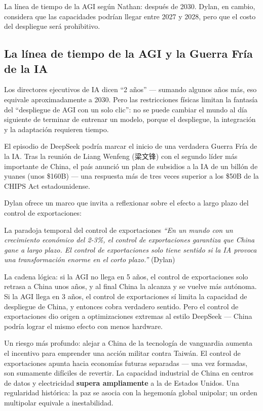 \documentclass[a4paper]{article}
\begin{document}
La línea de tiempo de la AGI según Nathan: después de 2030. Dylan, en cambio, considera que las capacidades podrían llegar entre 2027 y 2028, pero que el costo del despliegue será prohibitivo.

\subsection{La línea de tiempo de la AGI y la Guerra Fría de la IA}

Los directores ejecutivos de IA dicen ``2 años'' — sumando algunos años más, eso equivale aproximadamente a 2030. Pero las restricciones físicas limitan la fantasía del ``despliegue de AGI con un solo clic'': no se puede cambiar el mundo al día siguiente de terminar de entrenar un modelo, porque el despliegue, la integración y la adaptación requieren tiempo.

El episodio de DeepSeek podría marcar el inicio de una verdadera Guerra Fría de la IA. Tras la reunión de Liang Wenfeng (梁文锋) con el segundo líder más importante de China, el país anunció un plan de subsidios a la IA de un billón de yuanes (unos \$160B) — una respuesta más de tres veces superior a los \$50B de la CHIPS Act estadounidense.

Dylan ofrece un marco que invita a reflexionar sobre el efecto a largo plazo del control de exportaciones:

\begin{warningbox}{La paradoja temporal del control de exportaciones}
\textit{``En un mundo con un crecimiento económico del 2-3\%, el control de exportaciones garantiza que China gane a largo plazo. El control de exportaciones solo tiene sentido si la IA provoca una transformación enorme en el corto plazo.''} (Dylan)

La cadena lógica: si la AGI no llega en 5 años, el control de exportaciones solo retrasa a China unos años, y al final China la alcanza y se vuelve más autónoma. Si la AGI llega en 3 años, el control de exportaciones sí limita la capacidad de despliegue de China, y entonces cobra verdadero sentido. Pero el control de exportaciones dio origen a optimizaciones extremas al estilo DeepSeek — China podría lograr el mismo efecto con menos hardware.

Un riesgo más profundo: alejar a China de la tecnología de vanguardia aumenta el incentivo para emprender una acción militar contra Taiwán. El control de exportaciones apunta hacia economías futuras separadas — una vez formadas, son sumamente difíciles de revertir. La capacidad industrial de China en centros de datos y electricidad \textbf{supera ampliamente} a la de Estados Unidos. Una regularidad histórica: la paz se asocia con la hegemonía global unipolar; un orden multipolar equivale a inestabilidad.
\end{warningbox}
\end{document}
